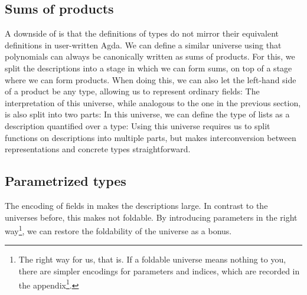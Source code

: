 \subsection{Sums of products}\label{ssec:background-sop}
A downside of  is that the definitions of types do not mirror their equivalent definitions in user-written Agda. We can define a similar universe using that polynomials can always be canonically written as sums of products. For this, we split the descriptions into a stage in which we can form sums, on top of a stage where we can form products.
When doing this, we can also let the left-hand side of a product be any type, allowing us to represent ordinary fields:
The interpretation of this universe, while analogous to the one in the previous section, is also split into two parts:
In this universe, we can define the type of lists as a description quantified over a type:
Using this universe requires us to split functions on descriptions into multiple parts, but makes interconversion between representations and concrete types straightforward.

\subsection{Parametrized types}\label{ssec:background-par}
The encoding of fields in  makes the descriptions large. In contrast to the universes before, this makes  not foldable. By introducing parameters in the right way\footnote{The right way for us, that is. If a foldable universe means nothing to you, there are simpler encodings for parameters and indices, which are recorded in the appendix\footnote{(ref)}.}, we can restore the foldability of the universe as a bonus.

